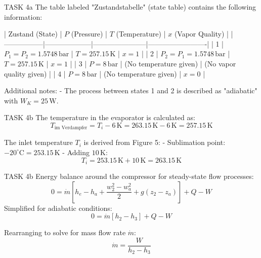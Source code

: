 TASK 4a  
The table labeled "Zustandstabelle" (state table) contains the following information:  

| Zustand (State) | \( P \) (Pressure) | \( T \) (Temperature) | \( x \) (Vapor Quality) |  
|-----------------|--------------------|-----------------------|-------------------------|  
| 1               | \( P_1 = P_2 = 1.5748 \, \text{bar} \) | \( T = 257.15 \, \text{K} \) | \( x = 1 \) |  
| 2               | \( P_2 = P_1 = 1.5748 \, \text{bar} \) | \( T = 257.15 \, \text{K} \) | \( x = 1 \) |  
| 3               | \( P = 8 \, \text{bar} \) | (No temperature given) | (No vapor quality given) |  
| 4               | \( P = 8 \, \text{bar} \) | (No temperature given) | \( x = 0 \) |  

Additional notes:  
- The process between states 1 and 2 is described as "adiabatic" with \( W_K = 25 \, \text{W} \).  

TASK 4b  
The temperature in the evaporator is calculated as:  
\[
T_{\text{im Verdampfer}} = T_i - 6 \, \text{K} = 263.15 \, \text{K} - 6 \, \text{K} = 257.15 \, \text{K}
\]  

The inlet temperature \( T_i \) is derived from Figure 5:  
- Sublimation point: \( -20^\circ \text{C} = 253.15 \, \text{K} \)  
- Adding \( 10 \, \text{K} \):  
\[
T_i = 253.15 \, \text{K} + 10 \, \text{K} = 263.15 \, \text{K}
\]  

TASK 4b  
Energy balance around the compressor for steady-state flow processes:  
\[
0 = \dot{m} \left[ h_e - h_a + \frac{w_2^2 - w_a^2}{2} + g \left( z_2 - z_a \right) \right] + Q - W
\]  
Simplified for adiabatic conditions:  
\[
0 = \dot{m} \left[ h_2 - h_3 \right] + Q - W
\]  

Rearranging to solve for mass flow rate \( \dot{m} \):  
\[
\dot{m} = \frac{W}{h_2 - h_3}
\]